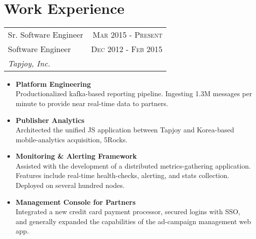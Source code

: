 \documentclass[10pt]{article} %
\begin{document}
\color{text1} %


\par{\\


\begin{minipage}[t]{0.5\textwidth}
\vspace{0pt} %


\section{Work Experience}


\begin{tabularx}{\linewidth}{ X r }
  {\large Sr. Software Engineer } & {\textsc{Mar 2015 - Present}} \\
  {\large Software Engineer } & {\textsc{Dec 2012 - Feb 2015}} \\
  {\small\textit{Tapjoy, Inc.}}
\end{tabularx}

\begin{itemize}
  \item \small\textbf{Platform Engineering} \\
    \small{Productionalized kafka-based reporting pipeline. Ingesting 1.3M messages per minute to provide near real-time data to partners.}
  \item \small\textbf{Publisher Analytics} \\
    \small{Architected the unified JS application between Tapjoy and Korea-based mobile-analytics acquisition, 5Rocks.}
  \item \small\textbf{Monitoring \& Alerting Framework} \\
    \small{Assisted with the development of a distributed metrics-gathering application. Features include real-time health-checks, alerting, and stats collection. Deployed on several hundred nodes.}
  \item \small\textbf{Management Console for Partners} \\
    \small{Integrated a new credit card payment processor, secured logins with SSO, and generally expanded the capabilities of the ad-campaign management web app.}


\end{itemize}
\end{minipage}}
\end{document}
